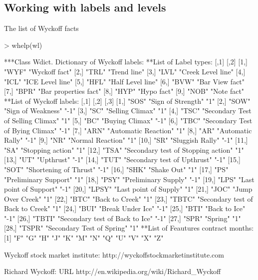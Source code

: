 \documentclass{article}
\begin{document}
\begin{appendices}
\section{Working with labels and levels}
The list of Wyckoff facts \cite{wyckoffinst}
\begin{Schunk}
\begin{Sinput}
> whelp(wl)
\end{Sinput}
\begin{Soutput}
***Class Wdict. Dictionary of Wyckoff labels:
**List of Label types:
      [,1]  [,2]                 
 [1,] "WYF" "Wyckoff fact"       
 [2,] "TRL" "Trend line"         
 [3,] "LVL" "Creek Level line"   
 [4,] "ICL" "ICE Level line"     
 [5,] "HFL" "Half Level line"    
 [6,] "BVW" "Bar View fact"      
 [7,] "BPR" "Bar properties fact"
 [8,] "HYP" "Hypo fact"          
 [9,] "NOB" "Note fact"          
**List of Wyckoff labels:
      [,1]   [,2]                                [,3]
 [1,] "SOS"  "Sign of Strength"                  "1" 
 [2,] "SOW"  "Sign of Weakness"                  "-1"
 [3,] "SC"   "Selling Climax"                    "1" 
 [4,] "TSC"  "Secondary Test of Selling Climax"  "1" 
 [5,] "BC"   "Buying Climax"                     "-1"
 [6,] "TBC"  "Secondary Test of Bying Climax"    "-1"
 [7,] "ARN"  "Automatic Reaction"                "1" 
 [8,] "AR"   "Automatic Rally"                   "-1"
 [9,] "NR"   "Normal Reaction"                   "1" 
[10,] "SR"   "Sluggish Rally"                    "-1"
[11,] "SA"   "Stopping action"                   "1" 
[12,] "TSA"  "Secondary test of Stopping action" "1" 
[13,] "UT"   "Upthrust"                          "-1"
[14,] "TUT"  "Secondary test of Upthrust"        "-1"
[15,] "SOT"  "Shortening of Thrust"              "-1"
[16,] "SHK"  "Shake Out"                         "1" 
[17,] "PS"   "Preliminary Support"               "1" 
[18,] "PSY"  "Preliminary Supply"                "-1"
[19,] "LPS"  "Last point of Support"             "-1"
[20,] "LPSY" "Last point of Supply"              "1" 
[21,] "JOC"  "Jump Over Creek"                   "1" 
[22,] "BTC"  "Back to Creek"                     "1" 
[23,] "TBTC" "Secondary test of Back to Creek"   "1" 
[24,] "BUI"  "Break Under Ice"                   "-1"
[25,] "BTI"  "Back to Ice"                       "-1"
[26,] "TBTI" "Secondary test of Back to Ice"     "-1"
[27,] "SPR"  "Spring"                            "1" 
[28,] "TSPR" "Secondary Test of Spring"          "1" 
**List of Feautures contract months:
 [1] "F" "G" "H" "J" "K" "M" "N" "Q" "U" "V" "X" "Z"
\end{Soutput}
\end{Schunk}

\end{appendices}

\begin{thebibliography}{99}

 Wyckoff stock market institute:
 http://wyckoffstockmarketinstitute.com

 Richard Wyckoff:
 URL http://en.wikipedia.org/wiki/Richard\_Wyckoff


\end{thebibliography}
\end{document}
